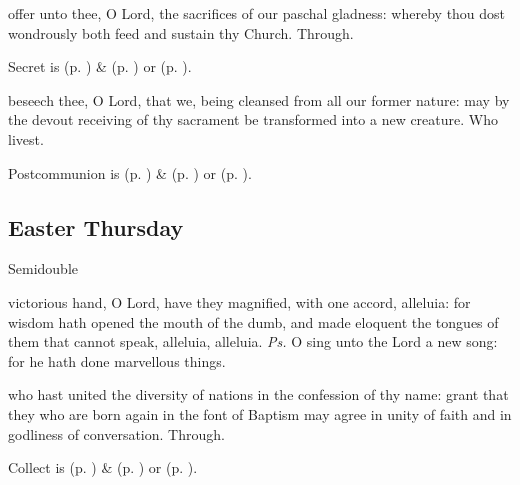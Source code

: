 \secret
{} offer unto thee, O Lord, the sacrifices of our paschal gladness: whereby thou dost wondrously both feed and sustain thy Church. Through.


\begin{rubric}
     Secret is  (p. \pageref{EasterSecret}) \&   (p. \pageref{SPAgainst}) or  (p. \pageref{SPChiefBishop}).
\end{rubric}


\postcommunion
{} beseech thee, O Lord, that we, being cleansed from all our former nature: may by the devout receiving of thy sacrament be transformed into a new creature. Who livest.
\begin{rubric}
     Postcommunion is  (p. \pageref{EasterPostcommunion}) \&   (p. \pageref{SPAgainst}) or  (p. \pageref{SPChiefBishop}).
\end{rubric}


\subsection{Easter Thursday}
\begin{inhead}
    {Semidouble}
\end{inhead}


\introit
{} victorious hand, O Lord, have they magnified, with one accord, alleluia: for wisdom hath opened the mouth of the dumb, and made eloquent the tongues of them that cannot speak, alleluia, alleluia. \textit{Ps.} O sing unto the Lord a new song: for he hath done marvellous things.

\collect
{} who hast united the diversity of nations in the confession of thy name: grant that they who are born again in the font of Baptism may agree in unity of faith and in godliness of conversation. Through.
\begin{rubric}
     Collect is  (p. \pageref{EasterCollect}) \&   (p. \pageref{SPAgainst}) or  (p. \pageref{SPChiefBishop}).
\end{rubric}

